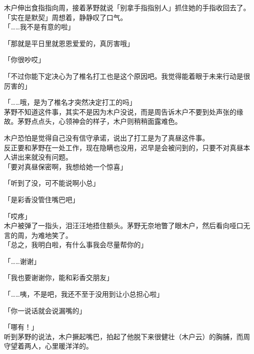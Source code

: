 木户伸出食指指向周，接着茅野就说「别拿手指指别人」抓住她的手指收回去了。「实在是默契」周想着，静静叹了口气。\\

「……我不是有意的啦」

「那就是平日里就恩恩爱爱的，真厉害哦」

「你很吵哎」

「不过你能下定决心为了椎名打工也是这个原因吧。我觉得能着眼于未来行动是很厉害的」

「……哦，是为了椎名才突然决定打工的吗」\\

茅野不知道这件事，其实不是因为木户没说，而是周告诉木户不要到处声张的缘故。茅野点点头，心领神会的样子，木户则稍稍面露难色。

木户恐怕是觉得自己没有信守承诺，说出了打工是为了真昼这件事。\\

反正要和茅野在一处工作，现在隐瞒也没用，迟早是会被问到的，只要不对真昼本人讲出来就没有问题。\\

「要对真昼保密啊，我想给她一个惊喜」

「听到了没，可不能说啊小总」

「是彩香没管住嘴巴吧」

「哎疼」\\

木户被弹了一指头，泪汪汪地捂住额头。茅野无奈地瞥了眼木户，然后看向哑口无言的周，为难地笑了。\\

「总之，我明白啦，有什么事我会尽量帮你的」

「……谢谢」

「我也要谢谢你，能和彩香交朋友」

「……咦，不是吧，我还不至于没用到让小总担心啦」

「你一说话就会说漏嘴的」

「哪有！」\\

听到茅野的说法，木户撅起嘴巴，拍起了他脱下来很健壮（木户云）的胸脯，而周守望着两人，心里暖洋洋的。
